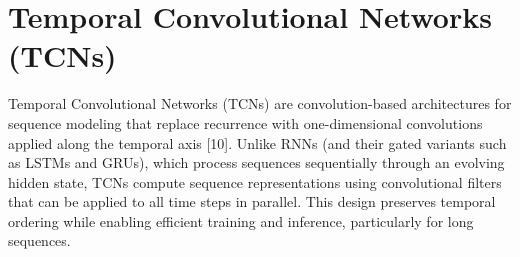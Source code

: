 \documentclass{article}
\renewcommand{\cite}[1]{[#1]}
\begin{document}


\section{Temporal Convolutional Networks (TCNs)}

Temporal Convolutional Networks (TCNs) are convolution-based architectures for sequence modeling that replace recurrence with one-dimensional convolutions applied along the temporal axis \cite{10}. Unlike RNNs (and their gated variants such as LSTMs and GRUs), which process sequences sequentially through an evolving hidden state, TCNs compute sequence representations using convolutional filters that can be applied to all time steps in parallel. This design preserves temporal ordering while enabling efficient training and inference, particularly for long sequences.
\end{document}
